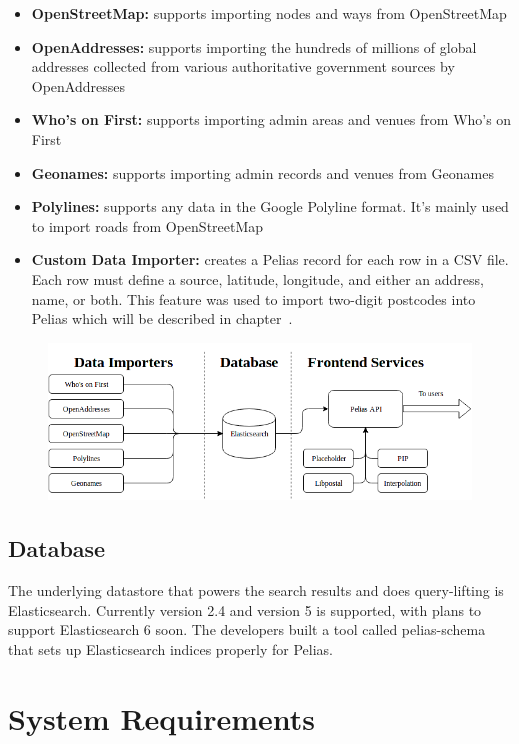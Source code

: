 \begin{itemize}
\item \textbf{OpenStreetMap:} supports importing nodes and ways from OpenStreetMap
\item \textbf{OpenAddresses:} supports importing the hundreds of millions of global addresses collected from various authoritative government sources by OpenAddresses
\item \textbf{Who's on First:} supports importing admin areas and venues from Who's on First
\item \textbf{Geonames:} supports importing admin records and venues from Geonames
\item \textbf{Polylines:} supports any data in the Google Polyline format. It's mainly used to import roads from OpenStreetMap
\item \textbf{Custom Data Importer:} creates a Pelias record for each row in a CSV file. Each row must define a source, latitude, longitude, and either an address, name, or both. This feature was used to import two-digit postcodes into Pelias which will be described in chapter~.
\end{itemize}

\begin{figure}[H]
\centering
\includegraphics[width=1.0\textwidth]{img/pelias_architecture}
\label{fig:pelias_architecture}
\end{figure}

\subsection{Database}
The underlying datastore that powers the search results and does query-lifting is Elasticsearch. Currently version 2.4 and version 5 is supported, with plans to support Elasticsearch 6 soon. The developers built a tool called pelias-schema that sets up Elasticsearch indices properly for Pelias.

\section{System Requirements}
